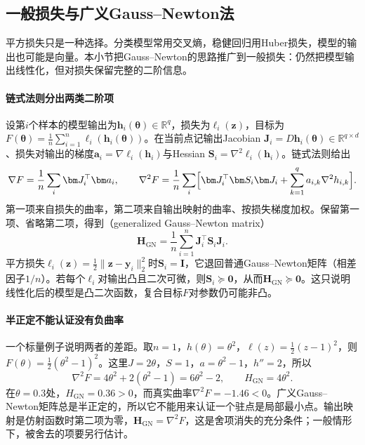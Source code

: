 \subsection{一般损失与广义Gauss--Newton法}
\label{sec:opt-fit-ggn}

平方损失只是一种选择。分类模型常用交叉熵，稳健回归用Huber损失，模型的输出也可能是向量。本小节把Gauss--Newton的思路推广到一般损失：仍然把模型输出线性化，但对损失保留完整的二阶信息。

\paragraph{链式法则分出两类二阶项}
设第$i$个样本的模型输出为$\bm h_i(\bm\theta)\in\mathbb R^{q}$，损失为$\ell_i(\bm z)$，目标为$F(\bm\theta)=\frac1n\sum_{i=1}^n\ell_i(\bm h_i(\bm\theta))$。在当前点记输出Jacobian $\bm J_i=D\bm h_i(\bm\theta)\in\mathbb R^{q\times d}$、损失对输出的梯度$\bm a_i=\nabla\ell_i(\bm h_i)$与Hessian $\bm S_i=\nabla^2\ell_i(\bm h_i)$。链式法则给出
\[
  \nabla F=\frac1n\sum_i\bm J_i^\top\bm a_i,\qquad
  \nabla^2F=\frac1n\sum_i\Bigl[\bm J_i^\top\bm S_i\bm J_i+\sum_{k=1}^qa_{i,k}\nabla^2h_{i,k}\Bigr].
\]
第一项来自损失的曲率，第二项来自输出映射的曲率、按损失梯度加权。保留第一项、省略第二项，得到（generalized Gauss--Newton matrix）
\begin{equation}
  \bm H_{\mathrm{GN}}=\frac1n\sum_{i=1}^n\bm J_i^\top\bm S_i\bm J_i .
  \label{eq:opt-fit-ggn}
\end{equation}
平方损失$\ell_i(\bm z)=\tfrac12\|\bm z-\bm y_i\|_2^2$时$\bm S_i=\bm I$，它退回普通Gauss--Newton矩阵（相差因子$1/n$）。若每个$\ell_i$对输出凸且二次可微，则$\bm S_i\succeq\bm0$，从而$\bm H_{\mathrm{GN}}\succeq\bm0$。这只说明线性化后的模型是凸二次函数，复合目标$F$对参数仍可能非凸。

\paragraph{半正定不能认证没有负曲率}
一个标量例子说明两者的差距。取$n=1$，$h(\theta)=\theta^2$，$\ell(z)=\tfrac12(z-1)^2$，则$F(\theta)=\tfrac12(\theta^2-1)^2$。这里$J=2\theta$，$S=1$，$a=\theta^2-1$，$h''=2$，所以
\[
  \nabla^2F=4\theta^2+2(\theta^2-1)=6\theta^2-2,\qquad H_{\mathrm{GN}}=4\theta^2 .
\]
在$\theta=0.3$处，$H_{\mathrm{GN}}=0.36>0$，而真实曲率$\nabla^2F=-1.46<0$。广义Gauss--Newton矩阵总是半正定的，所以它不能用来认证一个驻点是局部最小点。输出映射是仿射函数时第二项为零，$\bm H_{\mathrm{GN}}=\nabla^2F$，这是舍项消失的充分条件；一般情形下，被舍去的项要另行估计。

